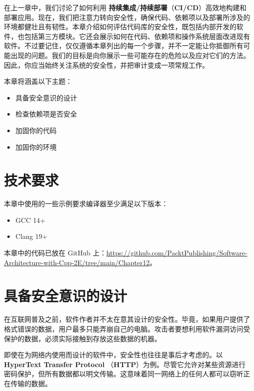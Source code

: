 在上一章中，我们讨论了如何利用 \textbf{持续集成/持续部署}（\textbf{CI/CD}）高效地构建和部署应用。现在，我们把注意力转向安全性，确保代码、依赖项以及部署所涉及的环境都健壮且有韧性。本章介绍如何评估代码库的安全性，既包括内部开发的软件，也包括第三方模块。它还会展示如何在代码、依赖项和操作系统层面改进现有软件。不过要记住，仅仅遵循本章列出的每一个步骤，并不一定能让你抵御所有可能出现的问题。我们的目标是向你展示一些可能存在的危险以及应对它们的方法。因此，你应当始终关注系统的安全性，并把审计变成一项常规工作。

本章将涵盖以下主题：

\begin{itemize}
\item 具备安全意识的设计
\item 检查依赖项是否安全
\item 加固你的代码
\item 加固你的环境
\end{itemize}

\section{技术要求}

本章中使用的一些示例要求编译器至少满足以下版本：

\begin{itemize}
\item GCC 14+
\item Clang 19+
\end{itemize}

本章中的代码已放在 GitHub 上：\href{https://github.com/PacktPublishing/Software-Architecture-with-Cpp-2E/tree/main/Chapter12}{https://github.com/PacktPublishing/Software-Architecture-with-Cpp-2E/tree/main/Chapter12}。

\section{具备安全意识的设计}

在互联网普及之前，软件作者并不太在意其设计的安全性。毕竟，如果用户提供了格式错误的数据，用户最多只能弄崩自己的电脑。攻击者要想利用软件漏洞访问受保护的数据，必须实际接触到存放这些数据的机器。

\label{idx:988}
\label{idx:989}
即使在为网络内使用而设计的软件中，安全性也往往是事后才考虑的。以 \textbf{HyperText Transfer Protocol }（\textbf{HTTP}）为例。尽管它允许对某些资源进行密码保护，但所有数据都以明文传输。这意味着同一网络上的任何人都可以窃听正在传输的数据。

